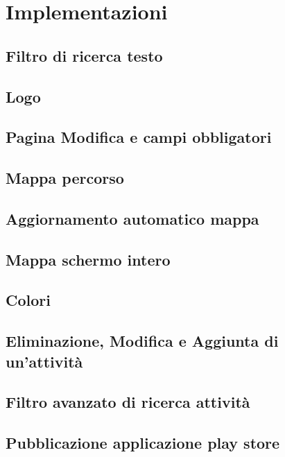 \section{Implementazioni}

\subsection{Filtro di ricerca testo}

\subsection{Logo}

\subsection{Pagina Modifica e campi obbligatori}

\subsection{Mappa percorso}

\subsection{Aggiornamento automatico mappa}

\subsection{Mappa schermo intero}

\subsection{Colori}

\subsection{Eliminazione, Modifica e Aggiunta di un'attività}

\subsection{Filtro avanzato di ricerca attività}

\subsection{Pubblicazione applicazione play store}


